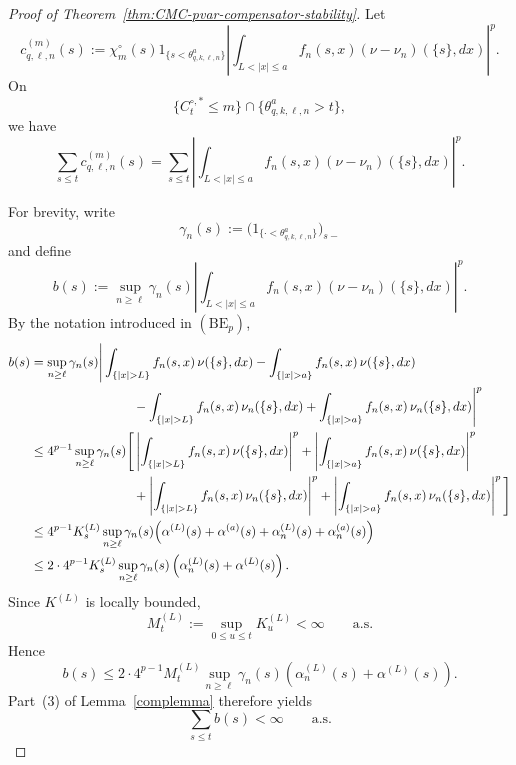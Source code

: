 \documentclass[a4paper,10pt]{article}
\begin{document}
\begin{proof}[Proof of Theorem~\ref{thm:CMC-pvar-compensator-stability}]
Let
\[
c_{q,\ell,n}^{(m)}(s)
:=
\chi_m^\circ(s)
1_{\{s<\theta^a_{q,k,\ell,n}\}}
\left|
\int_{L<|x|\le a}
f_n(s,x)(\nu-\nu_n)(\{s\},dx)
\right|^p.
\]
On
\[
        \{C_t^{\circ,*}\le m\}
        \cap
        \{\theta^a_{q,k,\ell,n}>t\},
\]
we have
\[
\sum_{s\le t}c_{q,\ell,n}^{(m)}(s)
=
\sum_{s\le t}
\left|
\int_{L<|x|\le a}
f_n(s,x)(\nu-\nu_n)(\{s\},dx)
\right|^p.
\]

For brevity, write
\[
\gamma_n(s)
:=
\bigl(1_{\{\cdot<\theta^a_{q,k,\ell,n}\}}\bigr)_{s-}
\]
and define
\[
b(s)
:=
\sup_{n\ge\ell}
\gamma_n(s)
\left|
\int_{L<|x|\le a}
f_n(s,x)(\nu-\nu_n)(\{s\},dx)
\right|^p.
\]
By the notation introduced in \((\mathrm{BE}_p)\),
\begin{align*}
b(s)
&=
\sup_{n\ge\ell}
\gamma_n(s)
\Bigg|
\int_{\{|x|>L\}}
f_n(s,x)\,\nu(\{s\},dx)
-
\int_{\{|x|>a\}}
f_n(s,x)\,\nu(\{s\},dx)
\\
&\hspace{8em}
-
\int_{\{|x|>L\}}
f_n(s,x)\,\nu_n(\{s\},dx)
+
\int_{\{|x|>a\}}
f_n(s,x)\,\nu_n(\{s\},dx)
\Bigg|^p
\\
&\le
4^{p-1}
\sup_{n\ge\ell}
\gamma_n(s)
\Bigg[
\left|
\int_{\{|x|>L\}}
f_n(s,x)\,\nu(\{s\},dx)
\right|^p
+
\left|
\int_{\{|x|>a\}}
f_n(s,x)\,\nu(\{s\},dx)
\right|^p
\\
&\hspace{8em}
+
\left|
\int_{\{|x|>L\}}
f_n(s,x)\,\nu_n(\{s\},dx)
\right|^p
+
\left|
\int_{\{|x|>a\}}
f_n(s,x)\,\nu_n(\{s\},dx)
\right|^p
\Bigg]
\\
&\le
4^{p-1}K_s^{(L)}
\sup_{n\ge\ell}
\gamma_n(s)
\Bigl(
\alpha^{(L)}(s)
+
\alpha^{(a)}(s)
+
\alpha_n^{(L)}(s)
+
\alpha_n^{(a)}(s)
\Bigr)
\\
&\le
2\cdot4^{p-1}K_s^{(L)}
\sup_{n\ge\ell}
\gamma_n(s)
\left(
\alpha_n^{(L)}(s)
+
\alpha^{(L)}(s)
\right).
\end{align*}
Since \(K^{(L)}\) is locally bounded,
\[
        M_t^{(L)}
        :=
        \sup_{0\le u\le t}K_u^{(L)}
        <\infty
        \qquad\text{a.s.}
\]
Hence
\[
b(s)
\le
2\cdot4^{p-1}M_t^{(L)}
\sup_{n\ge\ell}\gamma_n(s)
\left(
\alpha_n^{(L)}(s)+\alpha^{(L)}(s)
\right).
\]
Part~(3) of Lemma~\ref{complemma} therefore yields
\[
        \sum_{s\le t}b(s)<\infty
        \qquad\text{a.s.}
\]


\end{proof}
\end{document}
